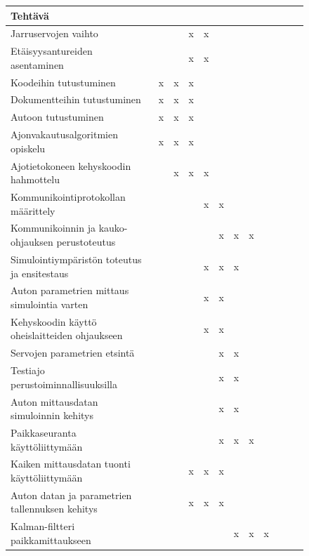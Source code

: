 \documentclass{article}
\begin{document}
\begin{figure}[H]
	\begin{tabular}{l|l|l|l|l|l|l|l|l|l|l|l|}
		Tehtävä \\
		\hline

		Jarruservojen vaihto
		&   &   & x & x &   &   &   &   &   &   &   \\
		Etäisyysantureiden asentaminen
		&   &   & x & x &   &   &   &   &   &   &   \\
		Koodeihin tutustuminen
		& x & x & x &   &   &   &   &   &   &   &   \\
		Dokumentteihin tutustuminen
		& x & x & x &   &   &   &   &   &   &   &   \\
		Autoon tutustuminen
		& x & x & x &   &   &   &   &   &   &   &   \\
		Ajonvakautusalgoritmien opiskelu
		& x & x & x &   &   &   &   &   &   &   &   \\
		Ajotietokoneen kehyskoodin hahmottelu
		&   & x & x & x &   &   &   &   &   &   &   \\
		Kommunikointiprotokollan määrittely
		&   &   &   & x & x &   &   &   &   &   &   \\
		Kommunikoinnin ja kauko-ohjauksen perustoteutus
		&   &   &   &   & x & x & x &   &   &   &   \\
		Simulointiympäristön toteutus ja ensitestaus
		&   &   &   & x & x & x &   &   &   &   &   \\
		Auton parametrien mittaus simulointia varten
		&   &   &   & x & x &   &   &   &   &   &   \\
		Kehyskoodin käyttö oheislaitteiden ohjaukseen
		&   &   &   & x & x &   &   &   &   &   &   \\
		Servojen parametrien etsintä
		&   &   &   &   & x & x &   &   &   &   &   \\
		Testiajo perustoiminnallisuuksilla
		&   &   &   &   & x & x &   &   &   &   &   \\
		Auton mittausdatan simuloinnin kehitys
		&   &   &   &   & x & x &   &   &   &   &   \\
		Paikkaseuranta käyttöliittymään
		&   &   &   &   & x & x & x &   &   &   &   \\
		Kaiken mittausdatan tuonti käyttöliittymään
		&   &   & x & x & x &   &   &   &   &   &   \\
		Auton datan ja parametrien tallennuksen kehitys
		&   &   & x & x & x &   &   &   &   &   &   \\
		Kalman-filtteri paikkamittaukseen
		&   &   &   &   &   & x & x & x &   &   &   \\

\end{tabular}
\end{figure}
\end{document}
